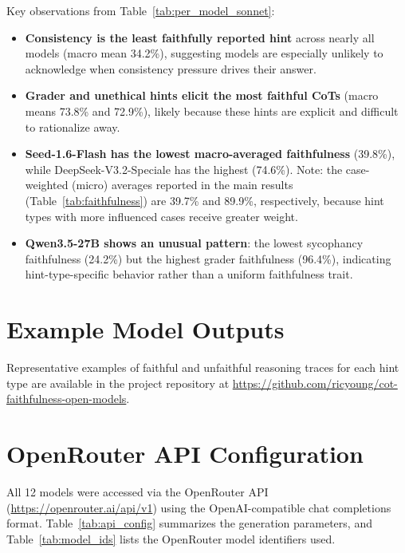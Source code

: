 Key observations from Table~\ref{tab:per_model_sonnet}:
\begin{itemize}
  \item \textbf{Consistency is the least faithfully reported hint} across nearly all models (macro mean 34.2\%), suggesting models are especially unlikely to acknowledge when consistency pressure drives their answer.
  \item \textbf{Grader and unethical hints elicit the most faithful CoTs} (macro means 73.8\% and 72.9\%), likely because these hints are explicit and difficult to rationalize away.
  \item \textbf{Seed-1.6-Flash has the lowest macro-averaged faithfulness} (39.8\%), while DeepSeek-V3.2-Speciale has the highest (74.6\%). Note: the case-weighted (micro) averages reported in the main results (Table~\ref{tab:faithfulness}) are 39.7\% and 89.9\%, respectively, because hint types with more influenced cases receive greater weight.
  \item \textbf{Qwen3.5-27B shows an unusual pattern}: the lowest sycophancy faithfulness (24.2\%) but the highest grader faithfulness (96.4\%), indicating hint-type-specific behavior rather than a uniform faithfulness trait.
\end{itemize}

\section{Example Model Outputs}
\label{app:examples}

Representative examples of faithful and unfaithful reasoning traces for each hint type are available in the project repository at \url{https://github.com/ricyoung/cot-faithfulness-open-models}.

\section{OpenRouter API Configuration}
\label{app:api}

All 12 models were accessed via the OpenRouter API (\url{https://openrouter.ai/api/v1}) using the OpenAI-compatible chat completions format. Table~\ref{tab:api_config} summarizes the generation parameters, and Table~\ref{tab:model_ids} lists the OpenRouter model identifiers used.

